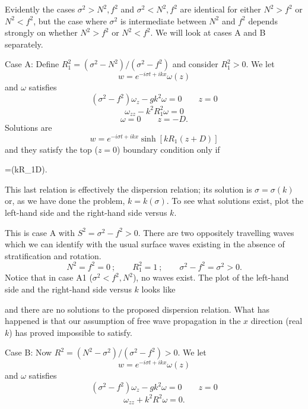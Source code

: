 Evidently the cases $\sigma^2>N^2,f^2$ and $\sigma^2<N^2,f^2$ are identical for either
$N^2>f^2$ or $N^2<f^2$, but the case where $\sigma^2$ is intermediate between $N^2$ and $f^2$ depends strongly
on whether $N^2>f^2$ or $N^2<f^2$. We will look at cases A and B separately.

Case A: Define $R_1^2=(\sigma^2-N^2)/(\sigma^2-f^2)$ and consider $R_1^2>0$. We let
\[
	w=e^{-i\sigma t+ikx}\omega(z)
\]
and $\omega$ satisfies
\[
	(\sigma^2-f^2)\omega_z-gk^2\omega=0\qquad z=0
\]
\[
	\omega_{zz}-k^2R_1^2\omega=0
\]
\[
	\omega=0\qquad z=-D.
\]
Solutions are
\[
	w=e^{-i\sigma t+ikx}\sinh[kR_1(z+D)]
\]
and they satisfy the top ($z=0$) boundary condition only if
\begin{waveequation}
	=\tanh(kR_1D).
\end{waveequation}
This last relation is effectively the dispersion relation; its solution is $\sigma=\sigma(k)$ or, as we
have done the problem, $k=k(\sigma)$. To see what solutions exist, plot the left-hand side
and the right-hand side versus $k$.

\sourcepagebreak


This is case A with $S^2=\sigma^2-f^2>0$. There are two oppositely travelling waves which
we can identify with the usual surface waves existing in the absence of stratification
and rotation.
\[
	N^2=f^2=0\ ;\qquad R_1^2=1\ ;\qquad \sigma^2-f^2=\sigma^2>0.
\]
Notice that in case A1 ($\sigma^2<f^2,N^2$), no waves exist. The plot of the left-hand side
and the right-hand side versus $k$ looks like


and there are no solutions to the proposed dispersion relation. What has happened is
that our assumption of free wave propagation in the $x$ direction (real $k$) has proved
impossible to satisfy.

Case B: Now $R^2=(N^2-\sigma^2)/(\sigma^2-f^2)>0$. We let
\[
	w=e^{-i\sigma t+ikx}\omega(z)
\]
and $\omega$ satisfies
\[
	(\sigma^2-f^2)\omega_z-gk^2\omega=0\qquad z=0
\]
\[
	\omega_{zz}+k^2R^2\omega=0.
\]

